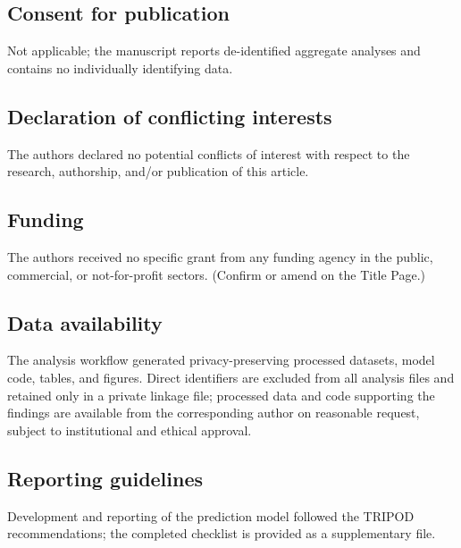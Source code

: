 \documentclass[11pt]{article}
\begin{document}
\subsection*{Consent for publication}
Not applicable; the manuscript reports de-identified aggregate analyses and
contains no individually identifying data.

\subsection*{Declaration of conflicting interests}
The authors declared no potential conflicts of interest with respect to the
research, authorship, and/or publication of this article.

\subsection*{Funding}
The authors received no specific grant from any funding agency in the
public, commercial, or not-for-profit sectors. (Confirm or amend on the
Title Page.)

\subsection*{Data availability}
The analysis workflow generated privacy-preserving processed datasets,
model code, tables, and figures. Direct identifiers are excluded from all
analysis files and retained only in a private linkage file; processed data
and code supporting the findings are available from the corresponding
author on reasonable request, subject to institutional and ethical
approval.

\subsection*{Reporting guidelines}
Development and reporting of the prediction model followed the TRIPOD
recommendations; the completed checklist is provided as a supplementary
file.



\end{document}
